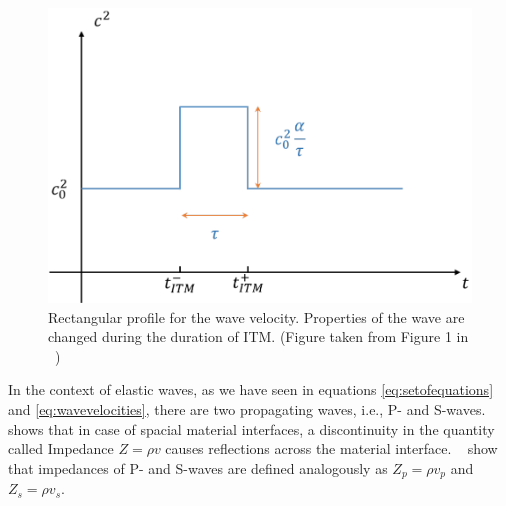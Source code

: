\begin{figure}[!htpb]
    \centering
    \includegraphics[width=0.6\linewidth]{figures/delta_speed.png}
    \caption{Rectangular profile for the wave velocity. Properties of the wave are changed during the duration of \ac{ITM}. (Figure taken from Figure 1 in ~\parencite[Supplementary Material]{Bacot2016})}
    \label{fig:deltavelocity}
\end{figure}

In the context of elastic waves, as we have seen in equations \ref{eq:setofequations} and \ref{eq:wavevelocities}, there are two propagating waves, i.e., P- and S-waves. 
~\parencite[Sec 9.6-Sec 9.8]{leveque_2002} shows that in case of spacial material interfaces, a discontinuity in the quantity called Impedance $Z = \rho v$
causes reflections across the material interface. ~\parencite[Eq. 1.66 and 1.180]{kaufman} show that impedances of P- and S-waves are defined analogously as
$Z_p = \rho v_p$ and $Z_s = \rho v_s$.